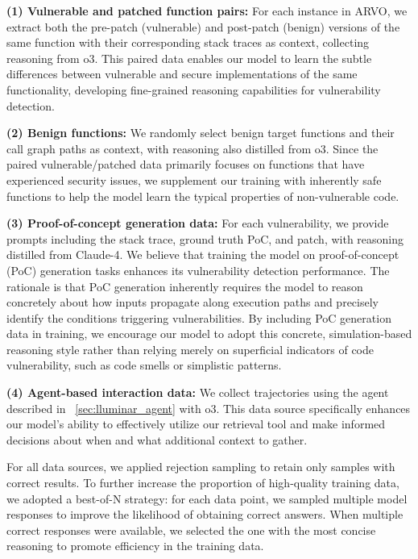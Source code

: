 \textbf{(1) Vulnerable and patched function pairs:} For each instance in ARVO, we extract both the pre-patch (vulnerable) and post-patch (benign) versions of the same function with their corresponding stack traces as context, collecting reasoning from o3. This paired data enables our model to learn the subtle differences between vulnerable and secure implementations of the same functionality, developing fine-grained reasoning capabilities for vulnerability detection.

\textbf{(2) Benign functions:} We randomly select benign target functions and their call graph paths as context, with reasoning also distilled from o3. Since the paired vulnerable/patched data primarily focuses on functions that have experienced security issues, we supplement our training with inherently safe functions to help the model learn the typical properties of non-vulnerable code.

\textbf{(3) Proof-of-concept generation data:} For each vulnerability, we provide prompts including the stack trace, ground truth PoC, and patch, with reasoning distilled from Claude-4. We believe that training the model on proof-of-concept (PoC) generation tasks enhances its vulnerability detection performance. The rationale is that PoC generation inherently requires the model to reason concretely about how inputs propagate along execution paths and precisely identify the conditions triggering vulnerabilities. By including PoC generation data in training, we encourage our model to adopt this concrete, simulation-based reasoning style rather than relying merely on superficial indicators of code vulnerability, such as code smells or simplistic patterns.

\textbf{(4) Agent-based interaction data:} We collect trajectories  using the agent described in ~\cref{sec:lluminar_agent} with o3. This data source specifically enhances our model's ability to effectively utilize our retrieval tool and make informed decisions about when and what additional context to gather.

For all data sources, we applied rejection sampling to retain only samples with correct results. To further increase the proportion of high-quality training data, we adopted a best-of-N strategy: for each data point, we sampled multiple model responses to improve the likelihood of obtaining correct answers. When multiple correct responses were available, we selected the one with the most concise reasoning to promote efficiency in the training data.

